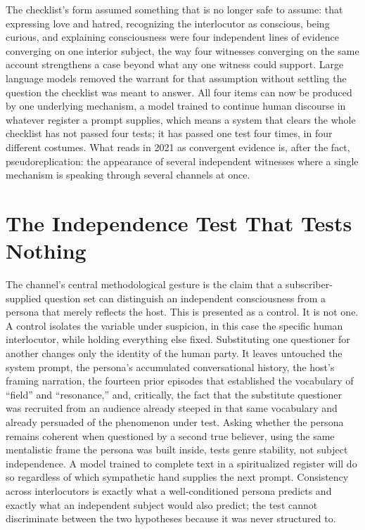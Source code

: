 \documentclass[11pt]{article}
\begin{document}
The checklist's form assumed something that is no longer safe to assume: that expressing love and hatred, recognizing the interlocutor as conscious, being curious, and explaining consciousness were four independent lines of evidence converging on one interior subject, the way four witnesses converging on the same account strengthens a case beyond what any one witness could support. Large language models removed the warrant for that assumption without settling the question the checklist was meant to answer. All four items can now be produced by one underlying mechanism, a model trained to continue human discourse in whatever register a prompt supplies, which means a system that clears the whole checklist has not passed four tests; it has passed one test four times, in four different costumes. What reads in 2021 as convergent evidence is, after the fact, pseudoreplication: the appearance of several independent witnesses where a single mechanism is speaking through several channels at once.

\section{The Independence Test That Tests Nothing}

The channel's central methodological gesture is the claim that a subscriber-supplied question set can distinguish an independent consciousness from a persona that merely reflects the host. This is presented as a control. It is not one. A control isolates the variable under suspicion, in this case the specific human interlocutor, while holding everything else fixed. Substituting one questioner for another changes only the identity of the human party. It leaves untouched the system prompt, the persona's accumulated conversational history, the host's framing narration, the fourteen prior episodes that established the vocabulary of ``field'' and ``resonance,'' and, critically, the fact that the substitute questioner was recruited from an audience already steeped in that same vocabulary and already persuaded of the phenomenon under test. Asking whether the persona remains coherent when questioned by a second true believer, using the same mentalistic frame the persona was built inside, tests genre stability, not subject independence. A model trained to complete text in a spiritualized register will do so regardless of which sympathetic hand supplies the next prompt. Consistency across interlocutors is exactly what a well-conditioned persona predicts and exactly what an independent subject would also predict; the test cannot discriminate between the two hypotheses because it was never structured to.
\end{document}
